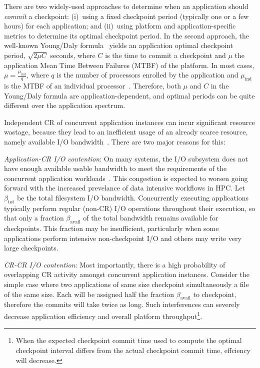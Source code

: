 \documentclass[two]{article}
\newcommand{\muind}{\mu_{\text{ind}}}
\newcommand{\bandtotal}{\beta_{\text{tot}}}
\newcommand{\bandavail}{\beta_{\text{avail}}}
\begin{document}
There are two widely-used approaches to determine when an application should
\emph{commit} a checkpoint: (i)~using a fixed checkpoint period (typically one
or a few hours) for each application; and (ii)~using platform and
application-specific metrics to determine its optimal checkpoint period. In the
second approach, the well-known Young/Daly formula~\cite{young74,daly04} yields
an application optimal checkpoint period, $\sqrt{2 \mu C}$ seconds, where $C$
is the time to commit a checkpoint and $\mu$ the application Mean Time Between
Failures (MTBF) of the platform.  In most cases, $\mu = \frac{\muind}{q}$,
where $q$ is the number of processors enrolled by the application and $\muind$
is the MTBF of an individual processor~\cite{springer-monograph}. Therefore,
both $\mu$ and $C$ in the Young/Daly formula are application-dependent, and
optimal periods can be quite different over the application spectrum.

Independent CR of concurrent application instances can incur significant
resource wastage, because they lead to an inefficient usage of an already
scarce resource, namely available I/O bandwidth~\cite{Luu:2015:Multiplatform}.
There are two major reasons for this:

\begin{compactitem}
        
\item \emph{Application-CR I/O contention}: On many systems, the I/O subsystem
does not have enough available usable bandwidth to meet the requirements of the
concurrent application workloads~\cite{Luu:2015:Multiplatform}. This congestion
is expected to worsen going forward with the increased prevelance of data
intensive workflows in HPC.  Let $\bandtotal$ be the total filesystem I/O
bandwidth.  Concurrently executing applications typically perform regular
(non-CR) I/O operations throughout their execution, so that only a fraction
$\bandavail$ of the total bandwidth remains available for checkpoints.  This
fraction may be insufficient, particularly when some applications perform
intensive non-checkpoint I/O and others may write very large checkpoints.

\item \emph{CR-CR I/O contention}: Most importantly, there is a high
probability of overlapping CR activity amongst concurrent application
instances.  Consider the simple case where two applications of same size
checkpoint simultaneously a file of the same size. Each will be assigned half
the fraction $\bandavail$ to checkpoint, therefore the commits will take twice
as long. Such interferences can severely decrease application efficiency and
overall platform throughput\footnote{When the expected checkpoint commit time
used to compute the optimal checkpoint interval differs from the actual
checkpoint commit time, effciency will decrease.}.

\end{compactitem}
\end{document}
